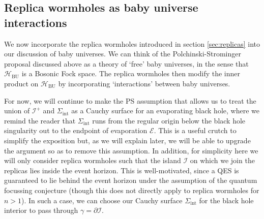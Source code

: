 \documentclass[letterpaper,12pt]{article}
\newcommand*{\hbu}{\mathcal{H}_\text{BU}} %
\newcommand*{\scri}{\mathscr{I}} %
\newcommand*{\evap}{\mathscr{E}} %
\newcommand*{\island}{\mathcal{I}}
\begin{document}
\subsection{Replica wormholes as baby universe interactions}
\label{sec:RWBUI}

We now incorporate the replica wormholes introduced in section \ref{sec:replicas} into our discussion of baby universes. We can think of the Polchinski-Strominger proposal discussed above as a theory of `free' baby universes, in the sense that $\hbu$ is a Bosonic Fock space.  The replica wormholes then modify the inner product on $\hbu$ by incorporating `interactions' between baby universes.

For now, we will continue to make the PS assumption that allows us to treat the union of $\scri^+$ and $\Sigma_\mathrm{int}$ as a Cauchy surface for an evaporating black hole, where we remind the reader that $\Sigma_\mathrm{int}$ runs from the regular origin below the black hole singularity out to the endpoint of evaporation $\evap$. This is a useful crutch to simplify the exposition but, as we will explain later, we will be able to upgrade the argument so as to remove this assumption.  In addition, for simplicity here we will only consider replica wormholes such that the island $\island$ on which we join the replicas lies inside the event horizon. This is well-motivated, since a QES is guaranteed to lie behind the event horizon under the assumption of the quantum focussing conjecture \cite{Bousso:2015mna} (though this does not directly apply to replica wormholes for $n>1$). In such a case, we can choose our Cauchy surface $\Sigma_\mathrm{int}$ for the black hole interior to pass through $\gamma = \partial\island$.
\end{document}

